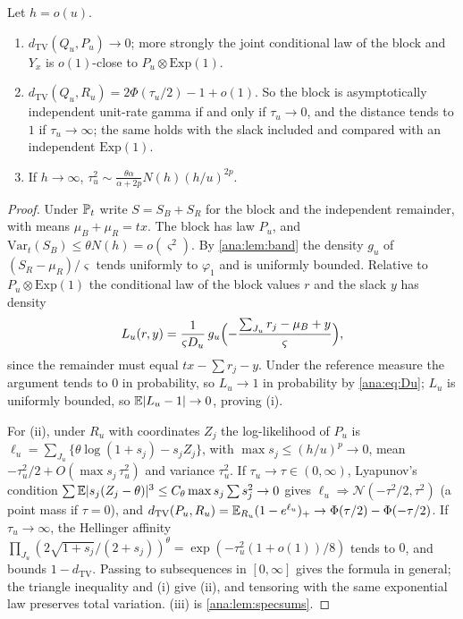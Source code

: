 \begin{theorem}\label{ana:thm:block}
Let $h=o(u)$.
\begin{enumerate}[label=\textup{(\roman*)}]
\item $d_{\mathrm{TV}}(Q_u,P_u)\to0$; more strongly the joint conditional law of the block and $Y_x$ is
 $o(1)$-close to $P_u\otimes\mathrm{Exp}(1)$.
\item $d_{\mathrm{TV}}(Q_u,R_u)=2\Phi(\tau_u/2)-1+o(1)$. So the block is asymptotically independent
 unit-rate gamma if and only if $\tau_u\to0$, and the distance tends to $1$ if $\tau_u\to\infty$; the
 same holds with the slack included and compared with an independent $\mathrm{Exp}(1)$.
\item If $h\to\infty$, $\tau_u^2\sim\frac{\theta\alpha}{\alpha+2p}N(h)(h/u)^{2p}$.
\end{enumerate}
\end{theorem}

\begin{proof}
Under $\mathbb{P}_t$ write $S=S_B+S_R$ for the block and the independent remainder, with means
$\mu_B+\mu_R=tx$. The block has law $P_u$, and $\mathrm{Var}_t(S_B)\le\theta N(h)=o(\varsigma^2)$. By
\cref{ana:lem:band} the density $g_u$ of $(S_R-\mu_R)/\varsigma$ tends uniformly to $\varphi_1$ and is
uniformly bounded. Relative to $P_u\otimes\mathrm{Exp}(1)$ the conditional law of the block values $r$
and the slack $y$ has density
\begin{equation}\label{ana:eq:blockratio}
 L_u(r,y)=\frac1{\varsigma D_u}\,g_u\Bigl(-\frac{\sum_{J_u}r_j-\mu_B+y}\varsigma\Bigr),
\end{equation}
since the remainder must equal $tx-\sum r_j-y$. Under the reference measure the argument tends to $0$ in
probability, so $L_u\to1$ in probability by \eqref{ana:eq:Du}; $L_u$ is uniformly bounded, so
$\mathbb{E}\lvert L_u-1\rvert\to0$, proving (i).

For (ii), under $R_u$ with coordinates $Z_j$ the log-likelihood of $P_u$ is
$\ell_u=\sum_{J_u}\{\theta\log(1+s_j)-s_jZ_j\}$, with $\max s_j\le(h/u)^p\to0$, mean
$-\tau_u^2/2+O(\max s_j\,\tau_u^2)$ and variance $\tau_u^2$. If $\tau_u\to\tau\in(0,\infty)$, Lyapunov's
condition $\sum\mathbb{E}\lvert s_j(Z_j-\theta)\rvert^3\le C_\theta\max s_j\sum s_j^2\to0$ gives
$\ell_u\Rightarrow\mathcal N(-\tau^2/2,\tau^2)$ (a point mass if $\tau=0$), and
$d_{\mathrm{TV}}(P_u,R_u)=\mathbb{E}_{R_u}(1-e^{\ell_u})_+\to\Phi(\tau/2)-\Phi(-\tau/2)$. If $\tau_u\to\infty$,
the Hellinger affinity $\prod_{J_u}(2\sqrt{1+s_j}/(2+s_j))^\theta=\exp(-\tau_u^2(1+o(1))/8)$ tends to $0$,
and bounds $1-d_{\mathrm{TV}}$. Passing to subsequences in $[0,\infty]$ gives the formula in general;
the triangle inequality and (i) give (ii), and tensoring with the same exponential law preserves total
variation. (iii) is \cref{ana:lem:specsums}.
\end{proof}

